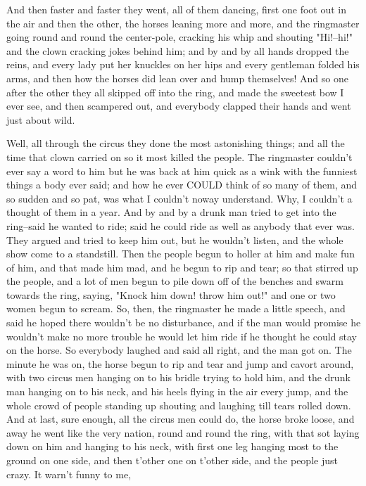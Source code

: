 And then faster and faster they went, all of them dancing, first one foot
out in the air and then the other, the horses leaning more and more, and
the ringmaster going round and round the center-pole, cracking his whip
and shouting "Hi!--hi!" and the clown cracking jokes behind him; and by
and by all hands dropped the reins, and every lady put her knuckles on
her hips and every gentleman folded his arms, and then how the horses did
lean over and hump themselves!  And so one after the other they all
skipped off into the ring, and made the sweetest bow I ever see, and then
scampered out, and everybody clapped their hands and went just about
wild.

Well, all through the circus they done the most astonishing things; and
all the time that clown carried on so it most killed the people.  The
ringmaster couldn't ever say a word to him but he was back at him quick
as a wink with the funniest things a body ever said; and how he ever
COULD think of so many of them, and so sudden and so pat, was what I
couldn't noway understand. Why, I couldn't a thought of them in a year.
And by and by a drunk man tried to get into the ring--said he wanted to
ride; said he could ride as well as anybody that ever was.  They argued
and tried to keep him out, but he wouldn't listen, and the whole show
come to a standstill.  Then the people begun to holler at him and make
fun of him, and that made him mad, and he begun to rip and tear; so that
stirred up the people, and a lot of men begun to pile down off of the
benches and swarm towards the ring, saying, "Knock him down! throw him
out!" and one or two women begun to scream.  So, then, the ringmaster he
made a little speech, and said he hoped there wouldn't be no disturbance,
and if the man would promise he wouldn't make no more trouble he would
let him ride if he thought he could stay on the horse.  So everybody
laughed and said all right, and the man got on. The minute he was on, the
horse begun to rip and tear and jump and cavort around, with two circus
men hanging on to his bridle trying to hold him, and the drunk man
hanging on to his neck, and his heels flying in the air every jump, and
the whole crowd of people standing up shouting and laughing till tears
rolled down.  And at last, sure enough, all the circus men could do, the
horse broke loose, and away he went like the very nation, round and round
the ring, with that sot laying down on him and hanging to his neck, with
first one leg hanging most to the ground on one side, and then t'other
one on t'other side, and the people just crazy.  It warn't funny to me,
